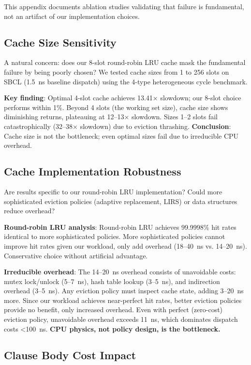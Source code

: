 \documentclass[sigplan,final,acmsmall,review,screen]{acmart}
\begin{document}
This appendix documents ablation studies validating that failure is fundamental, not an artifact of our implementation choices.

\subsection{Cache Size Sensitivity}

A natural concern: does our 8-slot round-robin LRU cache mask the fundamental failure by being poorly chosen? We tested cache sizes from 1 to 256 slots on SBCL (1.5~ns baseline dispatch) using the 4-type heterogeneous cycle benchmark.

\textbf{Key finding}: Optimal 4-slot cache achieves 13.41× slowdown; our 8-slot choice performs within 1\%. Beyond 4 slots (the working set size), cache size shows diminishing returns, plateauing at 12--13× slowdown. Sizes 1--2 slots fail catastrophically (32--38× slowdown) due to eviction thrashing. \textbf{Conclusion}: Cache size is not the bottleneck; even optimal sizes fail due to irreducible CPU overhead.

\subsection{Cache Implementation Robustness}

Are results specific to our round-robin LRU implementation? Could more sophisticated eviction policies (adaptive replacement, LIRS) or data structures reduce overhead?

\textbf{Round-robin LRU analysis}: Round-robin LRU achieves 99.9998\% hit rates identical to more sophisticated policies. More sophisticated policies cannot improve hit rates given our workload, only add overhead (18--40~ns vs. 14--20~ns). Conservative choice without artificial advantage.

\textbf{Irreducible overhead}: The 14--20~ns overhead consists of unavoidable costs: mutex lock/unlock (5--7~ns), hash table lookup (3--5~ns), and indirection overhead (3--5~ns). Any eviction policy must inspect cache state, adding 3--20~ns more. Since our workload achieves near-perfect hit rates, better eviction policies provide no benefit, only increased overhead. Even with perfect (zero-cost) eviction policy, unavoidable overhead exceeds 11~ns, which dominates dispatch costs <100~ns. \textbf{CPU physics, not policy design, is the bottleneck.}

\subsection{Clause Body Cost Impact}
\end{document}
